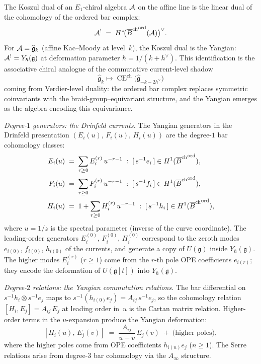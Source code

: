 \begin{construction}
The Koszul dual of an $E_1$-chiral algebra $\mathcal{A}$ on the
affine line is the linear dual of the cohomology of the
ordered bar complex:
\[
\mathcal{A}^!
\;=\;
H^*\!\bigl({\overline{B}^{\mathrm{ch}}}^{\mathrm{ord}}(\mathcal{A})\bigr)^\vee.
\]
For $\mathcal{A}=\widehat{\mathfrak g}_k$ (affine Kac--Moody at
level~$k$), the Koszul dual is the Yangian:
$\mathcal{A}^!=Y_\hbar(\mathfrak g)$ at deformation parameter
$\hbar=1/(k+h^\vee)$. This identification is the
associative chiral analogue of the commutative current-level shadow
\[
\widehat{\mathfrak g}_k
\longmapsto
\operatorname{CE}^{\mathrm{ch}}\!\bigl(\widehat{\mathfrak g}_{-k-2h^\vee}\bigr)
\]
coming from Verdier-level duality: the ordered bar complex replaces
symmetric coinvariants with the braid-group--equivariant
structure, and the Yangian emerges as the algebra encoding
this equivariance.

\emph{Degree-$1$ generators: the Drinfeld currents.}
The Yangian generators in the Drinfeld presentation
$(E_i(u),\,F_i(u),\,H_i(u))$ are the degree-$1$ bar
cohomology classes:
\begin{align*}
E_i(u)&\;=\;\sum_{r\ge 0}E_i^{(r)}\,u^{-r-1}
\;:\;
[\,s^{-1}e_i\,]\in H^1({\overline{B}^{\mathrm{ch}}}^{\mathrm{ord}}),\\
F_i(u)&\;=\;\sum_{r\ge 0}F_i^{(r)}\,u^{-r-1}
\;:\;
[\,s^{-1}f_i\,]\in H^1({\overline{B}^{\mathrm{ch}}}^{\mathrm{ord}}),\\
H_i(u)&\;=\;1+\sum_{r\ge 0}H_i^{(r)}\,u^{-r-1}
\;:\;
[\,s^{-1}h_i\,]\in H^1({\overline{B}^{\mathrm{ch}}}^{\mathrm{ord}}),
\end{align*}
where $u=1/z$ is the spectral parameter (inverse of the
curve coordinate). The leading-order generators
$E_i^{(0)}$, $F_i^{(0)}$, $H_i^{(0)}$ correspond to the
zeroth modes $e_{i(0)}$, $f_{i(0)}$, $h_{i(0)}$ of the
currents, and generate a copy of $U(\mathfrak g)$ inside
$Y_\hbar(\mathfrak g)$. The higher modes $E_i^{(r)}$
($r\ge 1$) come from the $r$-th pole OPE coefficients
$e_{i(r)}$; they encode the deformation of
$U(\mathfrak g[t])$ into $Y_\hbar(\mathfrak g)$.

\emph{Degree-$2$ relations: the Yangian commutation
relations.}
The bar differential on
$s^{-1}h_i\otimes s^{-1}e_j$ maps to $s^{-1}(h_{i(0)}e_j)
=A_{ij}\,s^{-1}e_j$, so the cohomology relation
$[H_i,E_j]=A_{ij}\,E_j$ at leading order in~$u$ is
the Cartan matrix relation. Higher-order terms in the
$u$-expansion produce the Yangian deformation:
\[
[H_i(u),\,E_j(v)]
\;=\;
\frac{A_{ij}}{u-v}\,E_j(v)
\;+\;\text{(higher poles)},
\]
where the higher poles come from OPE coefficients
$h_{i(n)}e_j$ ($n\ge 1$). The Serre relations arise from
degree-$3$ bar cohomology via the $A_\infty$ structure.


\end{construction}
